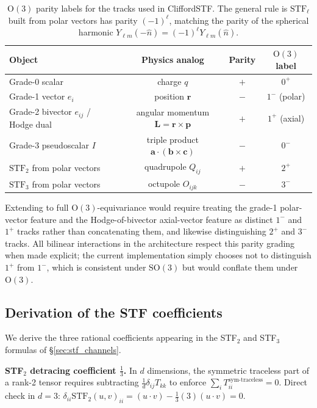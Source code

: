 \begin{table}[h]
\centering
\caption{$\mathrm{O}(3)$ parity labels for the tracks used in CliffordSTF. The general rule is $\mathrm{STF}_\ell$ built from polar vectors has parity $(-1)^\ell$, matching the parity of the spherical harmonic $Y_{\ell m}(-\hat{n}) = (-1)^\ell Y_{\ell m}(\hat{n})$.}\label{tab:parity}
\small
\begin{tabular}{lccc}
\toprule
Object & Physics analog & Parity & $\mathrm{O}(3)$ label \\
\midrule
Grade-0 scalar & charge $q$ & $+$ & $0^+$ \\
Grade-1 vector $e_i$ & position $\mathbf{r}$ & $-$ & $1^-$ (polar) \\
Grade-2 bivector $e_{ij}$ / Hodge dual & angular momentum $\mathbf{L}{=}\mathbf{r}\times\mathbf{p}$ & $+$ & $1^+$ (axial) \\
Grade-3 pseudoscalar $I$ & triple product $\mathbf{a}\cdot(\mathbf{b}\times\mathbf{c})$ & $-$ & $0^-$ \\
$\mathrm{STF}_2$ from polar vectors & quadrupole $Q_{ij}$ & $+$ & $2^+$ \\
$\mathrm{STF}_3$ from polar vectors & octupole $O_{ijk}$ & $-$ & $3^-$ \\
\bottomrule
\end{tabular}
\end{table}

Extending to full $\mathrm{O}(3)$-equivariance would require treating the grade-1 polar-vector feature and the Hodge-of-bivector axial-vector feature as distinct $1^-$ and $1^+$ tracks rather than concatenating them, and likewise distinguishing $2^+$ and $3^-$ tracks. All bilinear interactions in the architecture respect this parity grading when made explicit; the current implementation simply chooses not to distinguish $1^+$ from $1^-$, which is consistent under $\mathrm{SO}(3)$ but would conflate them under $\mathrm{O}(3)$.

\subsection{Derivation of the STF coefficients}\label{supp:stf_coefficients}

We derive the three rational coefficients appearing in the STF$_2$ and STF$_3$ formulas of \S\ref{sec:stf_channels}.

\textbf{STF$_2$ detracing coefficient $\tfrac{1}{3}$.} In $d$ dimensions, the symmetric traceless part of a rank-2 tensor requires subtracting $\tfrac{1}{d} \delta_{ij} T_{kk}$ to enforce $\sum_i T_{ii}^{\text{sym-traceless}} = 0$. Direct check in $d=3$: $\delta_{ii} \mathrm{STF}_2(u,v)_{ii} = (u\cdot v) - \tfrac{1}{3}(3)(u\cdot v) = 0$.

